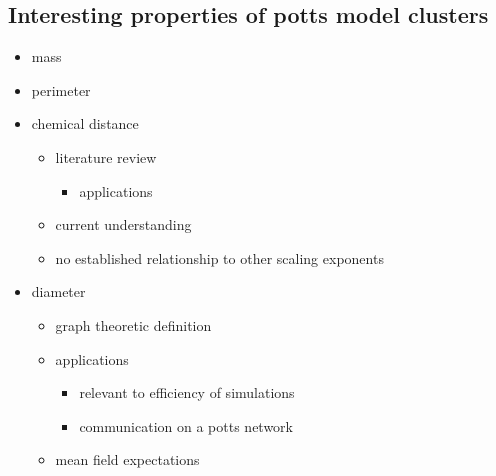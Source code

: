 \documentclass{umthesis}
\begin{document}
\subsection{Interesting properties of potts model clusters}
\label{sec-3.1.2}
\begin{itemize}

\item mass\\
\label{sec-3.1.2.1}%
\item perimeter\\
\label{sec-3.1.2.2}%
\item chemical distance
\label{sec-3.1.2.3}%
\begin{itemize}

\item literature review
\label{sec-3.1.2.3.1}%
\begin{itemize}

\item applications\\
\label{sec-3.1.2.3.1.1}%
\end{itemize} %

\item current understanding\\
\label{sec-3.1.2.3.2}%
\item no established relationship to other scaling exponents\\
\label{sec-3.1.2.3.3}%
\end{itemize} %

\item diameter
\label{sec-3.1.2.4}%
\begin{itemize}

\item graph theoretic definition\\
\label{sec-3.1.2.4.1}%
\item applications
\label{sec-3.1.2.4.2}%
\begin{itemize}

\item relevant to efficiency of simulations\\
\label{sec-3.1.2.4.2.1}%
\item communication on a potts network\\
\label{sec-3.1.2.4.2.2}%
\end{itemize} %

\item mean field expectations\\
\label{sec-3.1.2.4.3}%
\end{itemize} %
\end{itemize} %
\end{document}
